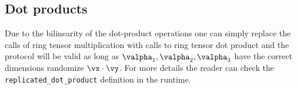 \subsection{Dot products}

Due to the bilinearity of the dot-product operations
one can simply replace the calls of ring tensor multiplication with
calls to ring tensor dot product and the protocol will be valid as long as
$\valpha_1, \valpha_2, \valpha_3$ have the correct dimensions
randomize $\vx \cdot \vy$. For more details the reader can check the
\verb|replicated_dot_product| definition in the runtime.




